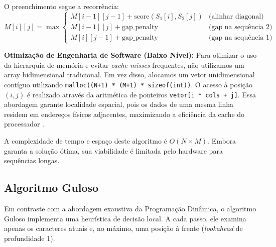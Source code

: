 \documentclass[12pt]{article}
\begin{document}
O preenchimento segue a recorrência:
\[
M[i][j] = \max
\begin{cases}
M[i-1][j-1] + \text{score}(S_1[i], S_2[j]) & \text{(alinhar diagonal)} \\
M[i-1][j] + \text{gap\_penalty} & \text{(gap na sequência 2)} \\
M[i][j-1] + \text{gap\_penalty} & \text{(gap na sequência 1)}
\end{cases}
\]

\textbf{Otimização de Engenharia de Software (Baixo Nível):}
Para otimizar o uso da hierarquia de memória e evitar \textit{cache misses} frequentes, não utilizamos um array bidimensional tradicional. Em vez disso, alocamos um vetor unidimensional contíguo utilizando \texttt{malloc((N+1) * (M+1) * sizeof(int))}. O acesso à posição $(i,j)$ é realizado através da aritmética de ponteiros \texttt{vetor[i * cols + j]}. Essa abordagem garante localidade espacial, pois os dados de uma mesma linha residem em endereços físicos adjacentes, maximizando a eficiência da cache do processador \cite{kernighan:89}.

A complexidade de tempo e espaço deste algoritmo é $O(N \times M)$. Embora garanta a solução ótima, sua viabilidade é limitada pelo hardware para sequências longas.

\subsection{Algoritmo Guloso}
\label{subsec:guloso}

Em contraste com a abordagem exaustiva da Programação Dinâmica, o algoritmo Guloso implementa uma heurística de decisão local. A cada passo, ele examina apenas os caracteres atuais e, no máximo, uma posição à frente (\textit{lookahead} de profundidade 1).
\end{document}
